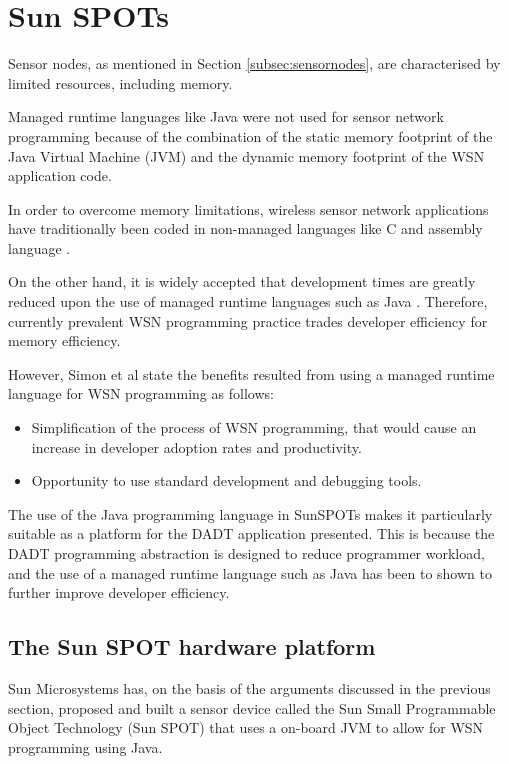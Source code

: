 \section {Sun SPOTs} \label{sec:sunspots}

Sensor nodes, as mentioned in Section \ref{subsec:sensornodes}, are
characterised by limited resources, including memory.
 
Managed runtime languages like Java were not used for sensor network programming
because of the combination of the static memory footprint of the Java Virtual
Machine (JVM) and the dynamic memory footprint of the WSN application code.

In order to overcome memory limitations, wireless sensor network applications
have traditionally been coded in non-managed languages like C and assembly
language \cite{simon_squawk:2006}.
 
On the other hand, it is widely accepted that development times are greatly reduced
upon the use of managed runtime languages such as Java
\cite{simon_squawk:2006}. Therefore, currently prevalent WSN programming practice
trades developer efficiency for memory efficiency. 

However, Simon et al \cite{simon_squawk:2006} state the benefits resulted from
using a managed runtime language for WSN programming as follows:

\begin{itemize}
  \item Simplification of the process of WSN programming, that would cause an
  increase in developer adoption rates and productivity.
  \item Opportunity to use standard development and debugging tools.
\end{itemize}

The use of the Java programming language in SunSPOTs makes it particularly suitable as a platform for the DADT application presented. This is because the DADT programming abstraction is designed to reduce programmer workload, and the use of a managed runtime language such as Java has been to shown to further improve developer efficiency. 
 
\subsection{The Sun SPOT hardware platform }
Sun Microsystems has, on the basis of the arguments discussed in the previous
section, proposed and built a sensor device
called the Sun Small Programmable Object Technology (Sun SPOT) that uses a
on-board JVM to allow for WSN programming using Java.

